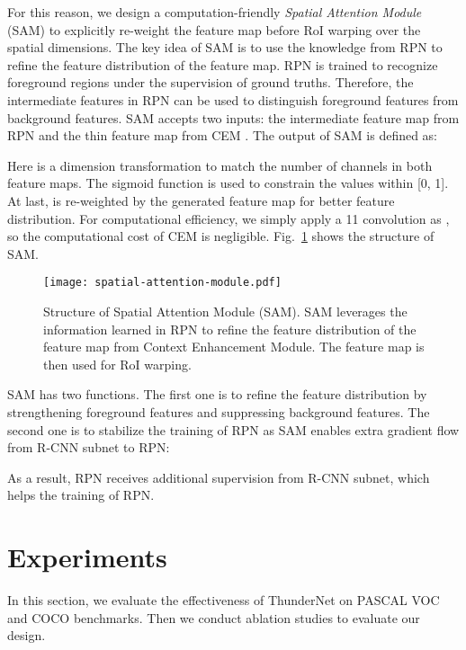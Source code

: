 \documentclass[10pt,twocolumn,letterpaper]{article}
\begin{document}
For this reason, we design a computation-friendly \emph{Spatial Attention Module} (SAM) to explicitly re-weight the feature map before RoI warping over the spatial dimensions.
The key idea of SAM is to use the knowledge from RPN to refine the feature distribution of the feature map.
RPN is trained to recognize foreground regions under the supervision of ground truths.
Therefore, the intermediate features in RPN can be used to distinguish foreground features from background features.
SAM accepts two inputs: the intermediate feature map from RPN  and the thin feature map from CEM .
The output of SAM  is defined as:

Here  is a dimension transformation to match the number of channels in both feature maps.
The sigmoid function is used to constrain the values within [0, 1].
At last,  is re-weighted by the generated feature map for better feature distribution.
For computational efficiency, we simply apply a 11 convolution as , so the computational cost of CEM is negligible.
Fig.~\ref{figure:spatial-attention-module} shows the structure of SAM.


\begin{figure}[!t]
\centering
\texttt{[image: spatial-attention-module.pdf]}
\caption{
Structure of Spatial Attention Module (SAM).
SAM leverages the information learned in RPN to refine the feature distribution of the feature map from Context Enhancement Module.
The feature map is then used for RoI warping.
}
\label{figure:spatial-attention-module}
\end{figure}

SAM has two functions.
The first one is to refine the feature distribution by strengthening foreground features and suppressing background features.
The second one is to stabilize the training of RPN as SAM enables extra gradient flow from R-CNN subnet to RPN:

As a result, RPN receives additional supervision from R-CNN subnet, which helps the training of RPN.


\section{Experiments}

In this section, we evaluate the effectiveness of ThunderNet on PASCAL VOC \cite{everingham2010pascal} and COCO \cite{lin2014microsoft} benchmarks.
Then we conduct ablation studies to evaluate our design.
\end{document}
